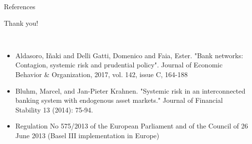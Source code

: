 \documentclass{beamer}
\begin{document}

\begin{frame}{References}

    Thank you!
    
    \

    \begin{itemize}
        \item  Aldasoro, Iñaki and Delli Gatti, Domenico and Faia, Ester. "Bank networks: Contagion, systemic risk and prudential policy". Journal of Economic Behavior \& Organization, 2017, vol. 142, issue C, 164-188
        \item Bluhm, Marcel, and Jan-Pieter Krahnen. "Systemic risk in an interconnected banking system with endogenous asset markets." Journal of Financial Stability 13 (2014): 75-94.
        \item Regulation No 575/2013 of the European Parliament and of the Council of 26 June 2013 (Basel III implementation in Europe)
    \end{itemize}

\end{frame}

    
\end{document}
